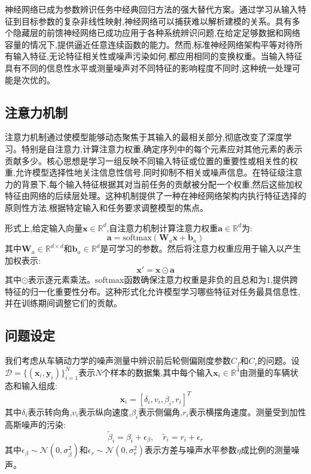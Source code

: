 \documentclass[Afour,sageh,times]{sagej}
\begin{document}
神经网络已成为参数辨识任务中经典回归方法的强大替代方案。通过学习从输入特征到目标参数的复杂非线性映射,神经网络可以捕获难以解析建模的关系。具有多个隐藏层的前馈神经网络已成功应用于各种系统辨识问题,在给定足够数据和网络容量的情况下,提供逼近任意连续函数的能力\citep{Narendra1990IdentificationAC}。然而,标准神经网络架构平等对待所有输入特征,无论特征相关性或噪声污染如何,都应用相同的变换权重。当输入特征具有不同的信息性水平或测量噪声对不同特征的影响程度不同时,这种统一处理可能是次优的。

\subsection{注意力机制}
\label{sec:attention}

注意力机制通过使模型能够动态聚焦于其输入的最相关部分,彻底改变了深度学习。特别是自注意力,计算注意力权重,确定序列中的每个元素应对其他元素的表示贡献多少。核心思想是学习一组反映不同输入特征或位置的重要性或相关性的权重,允许模型选择性地关注信息性信号,同时抑制不相关或噪声信息。在特征级注意力的背景下,每个输入特征根据其对当前任务的贡献被分配一个权重,然后这些加权特征由网络的后续层处理。这种机制提供了一种在神经网络架构内执行特征选择的原则性方法,根据特定输入和任务要求调整模型的焦点。

形式上,给定输入向量$\mathbf{x} \in \mathbb{R}^d$,自注意力机制计算注意力权重$\mathbf{a} \in \mathbb{R}^d$为:
\begin{equation}
\mathbf{a} = \text{softmax}(\mathbf{W}_a \mathbf{x} + \mathbf{b}_a)
\end{equation}
其中$\mathbf{W}_a \in \mathbb{R}^{d \times d}$和$\mathbf{b}_a \in \mathbb{R}^d$是可学习的参数。然后将注意力权重应用于输入以产生加权表示:
\begin{equation}
\mathbf{x}' = \mathbf{x} \odot \mathbf{a}
\end{equation}
其中$\odot$表示逐元素乘法。softmax函数确保注意力权重是非负的且总和为1,提供跨特征的归一化重要性分布。这种形式化允许模型学习哪些特征对任务最具信息性,并在训练期间调整它们的贡献。

\subsection{问题设定}
\label{sec:problem_setting}

我们考虑从车辆动力学的噪声测量中辨识前后轮侧偏刚度参数$C_f$和$C_r$的问题。设$\mathcal{D} = \{(\mathbf{x}_i, \mathbf{y}_i)\}_{i=1}^N$表示$N$个样本的数据集,其中每个输入$\mathbf{x}_i \in \mathbb{R}^4$由测量的车辆状态和输入组成:
\begin{equation}
\mathbf{x}_i = [\delta_i, v_i, \beta_i, r_i]^T
\end{equation}
其中$\delta_i$表示转向角,$v_i$表示纵向速度,$\beta_i$表示侧偏角,$r_i$表示横摆角速度。测量受到加性高斯噪声的污染:
\begin{equation}
\tilde{\beta}_i = \beta_i + \epsilon_\beta, \quad \tilde{r}_i = r_i + \epsilon_r
\end{equation}
其中$\epsilon_\beta \sim \mathcal{N}(0, \sigma_\beta^2)$和$\epsilon_r \sim \mathcal{N}(0, \sigma_r^2)$表示方差与噪声水平参数$\eta$成比例的测量噪声。
\end{document}
